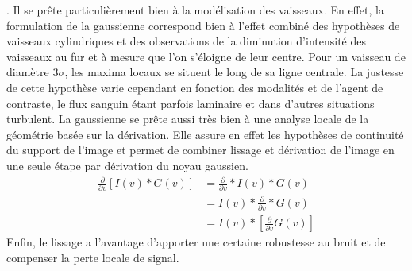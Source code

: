 . Il se prête particulièrement bien à la modélisation des vaisseaux. En effet, la formulation de la gaussienne correspond bien à l'effet combiné des hypothèses de vaisseaux cylindriques et des observations de la diminution d'intensité des vaisseaux au fur et à mesure que l'on s'éloigne de leur centre. Pour un vaisseau de diamètre $3\sigma$, les maxima locaux se situent le long de sa ligne centrale. La justesse de cette hypothèse varie cependant en fonction des modalités et de l'agent de contraste, le flux sanguin étant parfois laminaire et dans d'autres situations turbulent. La gaussienne se prête aussi très bien à une analyse locale de la géométrie basée sur la dérivation. Elle assure en effet les hypothèses de continuité du support de l'image et permet de combiner lissage et dérivation de l'image en une seule étape par dérivation du noyau gaussien. 
\begin{align}
  \frac{\partial}{\partial v} \left[ I(v) \ast G(v) \right] &= \frac{\partial}{\partial v} \ast I(v) \ast G(v) \\
                                                                &= I(v) \ast \frac{\partial}{\partial v} \ast G(v) \\
                                                                &= I(v) \ast \left[ \frac{\partial}{\partial v}G(v) \right]
\end{align}
Enfin, le lissage a l'avantage d'apporter une certaine robustesse au bruit et de compenser la perte locale de signal.


